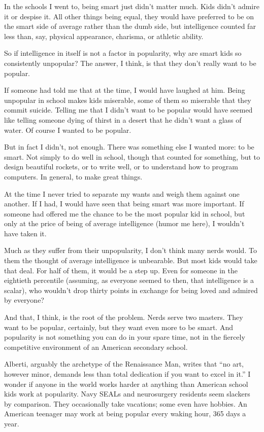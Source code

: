 In the schools I went to, being smart just didn't matter much. Kids
didn't admire it or despise it. All other things being equal, they would
have preferred to be on the smart side of average rather than the dumb
side, but intelligence counted far less than, say, physical appearance,
charisma, or athletic ability.

So if intelligence in itself is not a factor in popularity, why are
smart kids so consistently unpopular? The answer, I think, is that they
don't really want to be popular.

If someone had told me that at the time, I would have laughed at him.
Being unpopular in school makes kids miserable, some of them so
miserable that they commit suicide. Telling me that I didn't want to be
popular would have seemed like telling someone dying of thirst in a
desert that he didn't want a glass of water. Of course I wanted to be
popular.

But in fact I didn't, not enough. There was something else I wanted
more: to be smart. Not simply to do well in school, though that counted
for something, but to design beautiful rockets, or to write well, or to
understand how to program computers. In general, to make great things.

At the time I never tried to separate my wants and weigh them against
one another. If I had, I would have seen that being smart was more
important. If someone had offered me the chance to be the most popular
kid in school, but only at the price of being of average intelligence
(humor me here), I wouldn't have taken it.

Much as they suffer from their unpopularity, I don't think many nerds
would. To them the thought of average intelligence is unbearable. But
most kids would take that deal. For half of them, it would be a step up.
Even for someone in the eightieth percentile (assuming, as everyone
seemed to then, that intelligence is a scalar), who wouldn't drop thirty
points in exchange for being loved and admired by everyone?

And that, I think, is the root of the problem. Nerds serve two masters.
They want to be popular, certainly, but they want even more to be smart.
And popularity is not something you can do in your spare time, not in
the fiercely competitive environment of an American secondary school.

Alberti, arguably the archetype of the Renaissance Man, writes that ``no
art, however minor, demands less than total dedication if you want to
excel in it.'' I wonder if anyone in the world works harder at anything
than American school kids work at popularity. Navy SEALs and
neurosurgery residents seem slackers by comparison. They occasionally
take vacations; some even have hobbies. An American teenager may work at
being popular every waking hour, 365 days a year.

